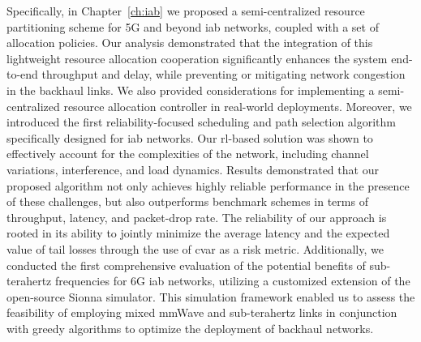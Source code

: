Specifically, in Chapter~\ref{ch:iab} we proposed a semi-centralized resource partitioning scheme for 5G and beyond \gls{iab} networks, coupled with a set of allocation policies. Our analysis demonstrated that the integration of this lightweight resource allocation cooperation significantly enhances the system end-to-end throughput and delay, while preventing or mitigating network congestion in the backhaul links. We also provided considerations for implementing a semi-centralized resource allocation controller in real-world deployments. 
Moreover, we introduced the first reliability-focused scheduling and path selection algorithm specifically designed for \gls{iab} networks. Our \gls{rl}-based solution was shown to effectively account for the complexities of the network, including channel variations, interference, and load dynamics. Results demonstrated that our proposed algorithm not only achieves highly reliable performance in the presence of these challenges, but also outperforms benchmark schemes in terms of throughput, latency, and packet-drop rate. The reliability of our approach is rooted in its ability to jointly minimize the average latency and the expected value of tail losses through the use of \gls{cvar} as a risk metric.
Additionally, we conducted the first comprehensive evaluation of the potential benefits of sub-terahertz frequencies for 6G \gls{iab} networks, utilizing a customized extension of the open-source Sionna simulator. This simulation framework enabled us to assess the feasibility of employing mixed mmWave and sub-terahertz links in conjunction with greedy algorithms to optimize the deployment of backhaul networks.

